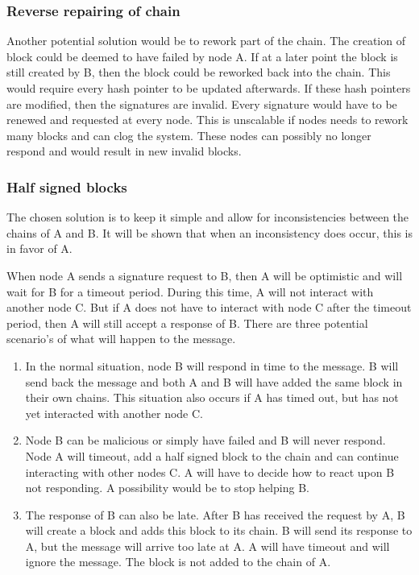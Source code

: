 \subsubsection{Reverse repairing of chain}
Another potential solution would be to rework part of the chain.
The creation of block could be deemed to have failed by node A.
If at a later point the block is still created by B,
then the block could be reworked back into the chain.
This would require every hash pointer to be updated afterwards.
If these hash pointers are modified, then the signatures are invalid.
Every signature would have to be renewed and requested at every node.
This is unscalable if nodes needs to rework many blocks and can clog the system.
These nodes can possibly no longer respond and would result in new invalid blocks.

\subsubsection{Half signed blocks}
\label{des:halfsigned}
The chosen solution is to keep it simple and allow for inconsistencies between the chains of A and B.
It will be shown that when an inconsistency does occur, this is in favor of A.

When node A sends a signature request to B,
then A will be optimistic and will wait for B for a timeout period.
During this time, A will not interact with another node C.
But if A does not have to interact with node C after the timeout period,
then A will still accept a response of B.
There are three potential scenario's of what will happen to the message.

\begin{enumerate}
\item
In the normal situation, node B will respond in time to the message.
B will send back the message
and both A and B will have added the same block in their own chains.
This situation also occurs if A has timed out,
but has not yet interacted with another node C.

\item
Node B can be malicious or simply have failed and B will never respond.
Node A will timeout, add a half signed block to the chain and can continue interacting with other nodes C.
A will have to decide how to react upon B not responding.
A possibility would be to stop helping B.

\item
The response of B can also be late.
After B has received the request by A,
B will create a block and adds this block to its chain.
B will send its response to A,
but the message will arrive too late at A.
A will have timeout and  will ignore the message.
The block is not added to the chain of A.
\end{enumerate}

